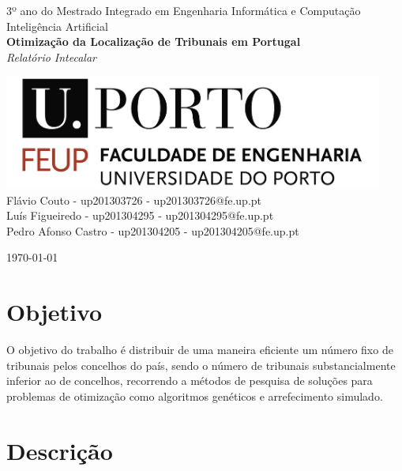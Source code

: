 \documentclass[11pt,a4paper,reqno]{article}
\numberwithin{equation}{section}
\begin{document}
\begin{titlepage}
\begin{center}

{\large 3º ano do Mestrado Integrado em Engenharia Informática e Computação \\[5mm]}
{\Large Inteligência Artificial}\\[2cm]

{\Huge \bfseries Otimização da Localização de Tribunais em Portugal \\[5mm]}
{\large \textit{Relatório Intecalar} \\[2cm]}

\includegraphics[width=12.5cm]{feup_logo.jpg}\\[2cm]

{\large Flávio Couto - up201303726 - up201303726@fe.up.pt\\[1mm]}
{\large Luís Figueiredo - up201304295 - up201304295@fe.up.pt \\[1mm]}
{\large Pedro Afonso Castro - up201304205 - up201304205@fe.up.pt\\[1mm]}


{\large \today}

\end{center}
\end{titlepage}

\tableofcontents

\section{Objetivo}

O objetivo do trabalho é distribuir de uma maneira eficiente um número fixo de tribunais pelos concelhos do país, sendo o número de tribunais substancialmente inferior ao de concelhos, recorrendo a métodos de pesquisa de soluções para problemas de otimização como algoritmos genéticos e arrefecimento simulado. 


\section{Descrição}
\end{document}
